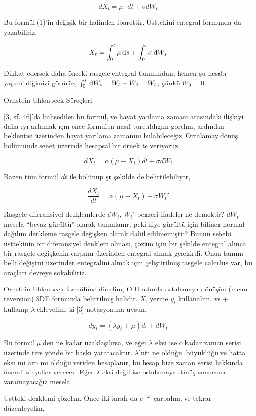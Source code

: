 \documentclass[12pt,fleqn]{article}\usepackage{../../common}
\begin{document}
$$ dX_t = \mu \cdot dt + \sigma dW_t $$

Bu formül (1)'in değişik bir halinden ibarettir. Üsttekini entegral
formunda da yazabiliriz, 

$$ X_t = \int_{0}^{t}\mu \,\mathrm{d} s + \int_{ 0}^{t} \sigma \,\mathrm{d} W_s $$

Dikkat edersek daha önceki rasgele entegral tanımından, hemen şu hesabı
yapabildiğimizi görürüz, $\int_{0}^{s} \,\mathrm{d} W_s = W_t - W_0 = W_t$, çünkü
$W_0=0$. 

Ornstein-Uhlenbeck Süreçleri

[3, sf. 46]'da bahsedilen bu formül, ve hayat yarılama zamanı arasındaki
ilişkiyi daha iyi anlamak için önce formülün nasıl türetildiğini görelim,
ardından beklentisi üzerinden hayat yarılama zamanını bulabileceğiz. Ortalamay
dönüş bölümünde senet üzerinde hesapsal bir örnek te veriyoruz.

$$ dX_t = \alpha(\mu - X_t)dt + \sigma dW_t $$

Bazen tüm formül $dt$ ile bölünüp şu şekilde de belirtilebiliyor, 

$$ \frac{dX_t}{dt} = \alpha(\mu - X_t) + \sigma W_t' $$

Rasgele diferansiyel denklemlerde $dW_t$, $W_t'$ benzeri ifadeler ne demektir?
$dW_t$ mesela ``beyaz gürültü'' olarak tanımlanır, peki niye gürültü için
bilinen normal dağılım denkleme rasgele değişken olarak dahil edilmemiştir?
Bunun sebebi üsttekinin bir diferansiyel denklem olması, çözüm için bir şekilde
entegral alınca bir rasgele değişkenin çarpımı üzerinden entegral almak
gerekirdi. Onun tanımı belli değişimi üzerinden entegralini almak için
geliştirilmiş rasgele calculus var, bu araçları devreye sokabiliriz.

Ornstein-Uhlenbeck formülüne dönelim, O-U aslında ortalamaya dönüşün
(mean-reversion) SDE formunda belirtilmiş halidir. $X_t$ yerine $y_t$
kullanalım, ve + kullanıp $\lambda$ ekleyelim, ki [3] notasyonuna uysun,

$$ dy_t = (\lambda y_t + \mu)dt + dW_t  $$

Bu formül $\mu$'den ne kadar uzaklaşılırsa, ve eğer $\lambda$ eksi ise o kadar
zaman serisi üzerinde ters yönde bir baskı yaratacaktır. $\lambda$'nin ne
olduğu, büyüklüğü ve hatta eksi mi artı mı olduğu veriden hesaplanır, bu hesap
bize zaman serisi hakkında önemli sinyaller verecek. Eğer $\lambda$ eksi değil
ise ortalamaya dönüş sonucuna varamayacağız mesela.

Üstteki denklemi çözelim. Önce iki tarafı da $e^{-\lambda t}$ çarpalım, ve
tekrar düzenleyelim,
\end{document}
